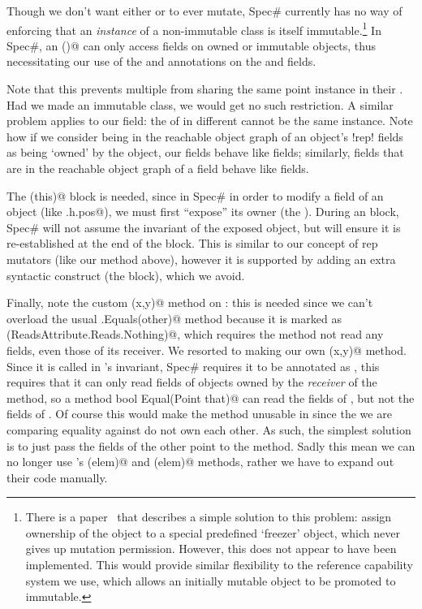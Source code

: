 Though we don't want either \Q@pos@ or \Q@path@ to ever mutate, Spec\# currently has no way of enforcing that an \emph{instance} of a non-immutable class is itself immutable.\footnote{There is a paper~\cite{DBLP:conf/vstte/LeinoMW08} that describes a simple solution to this problem: assign ownership of the object to a special predefined `freezer' object, which never gives up mutation permission. However, this does not appear to have been implemented. This would provide similar flexibility to the reference capability system we use, which allows an initially mutable object to be promoted to immutable.} In Spec\#, an \Q@invariant()@ can only access fields on owned or immutable objects, thus necessitating our use of the \Q@Peer@ and \Q@Rep@ annotations on the \Q@pos@ and \Q@path@ fields.

Note that this prevents multiple \Q@Cage@s from sharing the same point instance in their \Q@path@.
Had we made \Q@Point@ an immutable class, we would get no such restriction. A similar problem applies to our \Q@pos@ field: the \Q@pos@ of \Q@Hamster@s in different  \Q@Cage@s cannot be the same \Q@Point@ instance.
Note how if we consider being in the reachable object graph of an object's \Q!rep! fields as being `owned' by the object, our \Q@rep@ fields behave like \Q@Rep@ fields; similarly, \Q@mut@ fields that are in the reachable object graph of a \Q@rep@ field behave like \Q@Peer@ fields.

The \Q@expose(this)@ block is needed, since in Spec\# in order to modify a field of an object (like \Q@this.h.pos@), we must first ``expose'' its owner (the \Q@Cage@). During an \Q@expose@ block, Spec\# will not assume the invariant of the exposed object, but will ensure it is re-established at the end of the block. This is similar to our concept of rep mutators (like our \Q@moveTo@ method above), however it is supported by adding an extra syntactic construct (the \Q@expose@ block), which we avoid.

Finally, note the custom \Q@Equal(x,y)@ method on \Q@Point@: this is needed since we can't overload the usual \Q@Object.Equals(other)@ method because it is marked as \Q@Reads(ReadsAttribute.Reads.Nothing)@, which requires the method not read any fields, even those of its receiver.
We resorted to making our own \Q@Equal(x,y)@ method. Since it is called in \Q@Cage@'s invariant, Spec\# requires it to be annotated as \Q@Pure@, this requires that it can only read fields of objects owned by the \emph{receiver} of the method, so a method \Q@[Pure] bool Equal(Point that)@ can read the fields of \Q@this@, but not the fields of \Q@that@. Of course this would make the method unusable in \Q@Cage@ since the \Q@Point@s we are comparing equality against do not own each other. As such, the simplest solution is to just pass the fields of the other point to the method.
Sadly this mean we can no longer use \Q@List@'s \Q@Contains(elem)@ and \Q@IndexOf(elem)@ methods, rather we have to expand out their code manually.


